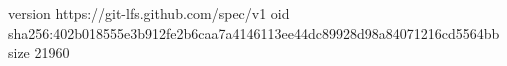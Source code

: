version https://git-lfs.github.com/spec/v1
oid sha256:402b018555e3b912fe2b6caa7a4146113ee44dc89928d98a84071216cd5564bb
size 21960
